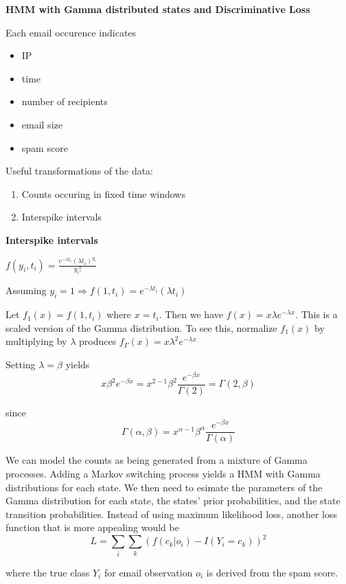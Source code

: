 \documentclass{article}
\begin{document}
  
 \textbf{HMM with Gamma distributed states and Discriminative Loss}
  
  

  
  Each email occurence indicates
  \begin{itemize}
  \item IP
  \item time
  \item number of recipients
  \item email size
  \item spam score
  \end{itemize}

  Useful transformations of the data:
  \begin{enumerate}
  \item Counts occuring in fixed time windows
  \item Interspike intervals
  \end{enumerate}

  \textbf{Interspike intervals}

  $f(y_i, t_i) = \frac{e^{-\lambda t_i} (\lambda t_i)^{y_i}}{y_i!}$

  Assuming $y_i = 1 \Rightarrow f(1, t_i) = e^{-\lambda t_i} (\lambda t_i)$

  Let $f_1(x) = f(1, t_i)$ where $x = t_i$. Then we have $f(x) = x \lambda e^{-\lambda x}$. This is a scaled version of the Gamma distribution. To see this, normalize $f_1(x)$ by multiplying by $\lambda$ produces $f_\Gamma(x) = x \lambda^2 e^{-\lambda x}$


  Setting $\lambda = \beta$ yields
  \[
  x \beta^2 e^{-\beta x} = x^{2-1} \beta^2 \frac{e^{-\beta x}}{\Gamma(2)} = \Gamma(2, \beta)
  \]

since 
  \[
  \Gamma(\alpha, \beta) = x^{\alpha-1} \beta^\alpha \frac{e^{-\beta x}}{\Gamma(\alpha)}
  \]

  We can model the counts as being generated from a mixture of Gamma processes. Adding a Markov switching process yields a HMM with Gamma distributions for each state. We then need to esimate the parameters of the Gamma distribution for each state, the states' prior probabilities, and the state transition probabilities. Instead of using maximum likelihood loss, another loss function that is more appealing would be
\[
L = \sum_i \sum_k (f(c_k | o_i) - I(Y_i = c_k))^2
\]

where the true class $Y_i$ for email observation $o_i$ is derived from the spam score.




  
  
\end{document}
